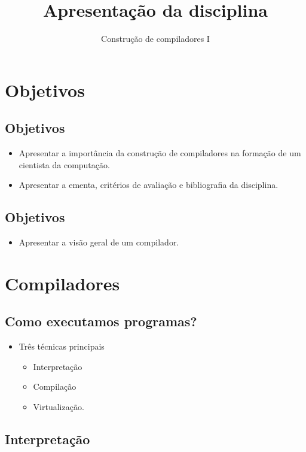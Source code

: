 \documentclass[11pt]{article}
\author{Construção de compiladores I}
\date{}
\title{Apresentação da disciplina}
\begin{document}
\maketitle
\section*{Objetivos}
\label{sec:org45f2319}

\subsection*{Objetivos}
\label{sec:org441fd78}

\begin{itemize}
\item Apresentar a importância da construção de compiladores na formação de um cientista da computação.
\item Apresentar a ementa, critérios de avaliação e bibliografia da disciplina.
\end{itemize}
\subsection*{Objetivos}
\label{sec:orga25ee60}

\begin{itemize}
\item Apresentar a visão geral de um compilador.
\end{itemize}
\section*{Compiladores}
\label{sec:org495af10}

\subsection*{Como executamos programas?}
\label{sec:orgd486270}
\begin{itemize}
\item Três técnicas principais
\begin{itemize}
\item Interpretação
\item Compilação
\item Virtualização.
\end{itemize}
\end{itemize}
\subsection*{Interpretação}
\label{sec:orgad50083}
\end{document}
